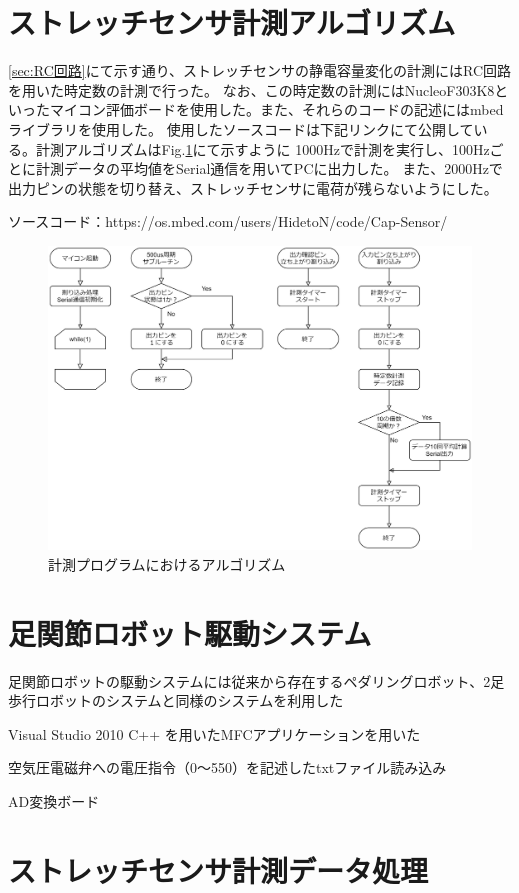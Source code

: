 \section{ストレッチセンサ計測アルゴリズム}
\ref{sec:RC回路}にて示す通り、ストレッチセンサの静電容量変化の計測にはRC回路を用いた時定数の計測で行った。
なお、この時定数の計測にはNucleoF303K8といったマイコン評価ボードを使用した。また、それらのコードの記述にはmbedライブラリを使用した。
使用したソースコードは下記リンクにて公開している。計測アルゴリズムはFig.\ref{fig:algorithm}にて示すように
1000Hzで計測を実行し、100Hzごとに計測データの平均値をSerial通信を用いてPCに出力した。
また、2000Hzで出力ピンの状態を切り替え、ストレッチセンサに電荷が残らないようにした。

ソースコード：https://os.mbed.com/users/HidetoN/code/Cap-Sensor/

\begin{figure}[h]
    \begin{center}
     \includegraphics[width=0.9\columnwidth,clip]{./3_analysis/algorithm.eps}
     \caption{計測プログラムにおけるアルゴリズム}
     \label{fig:algorithm}
    \end{center}
\end{figure}

\section{足関節ロボット駆動システム}
足関節ロボットの駆動システムには従来から存在するペダリングロボット、2足歩行ロボットのシステムと同様のシステムを利用した

Visual Studio 2010 C++ を用いたMFCアプリケーションを用いた

空気圧電磁弁への電圧指令（0～550）を記述したtxtファイル読み込み

AD変換ボード

\section{ストレッチセンサ計測データ処理}
